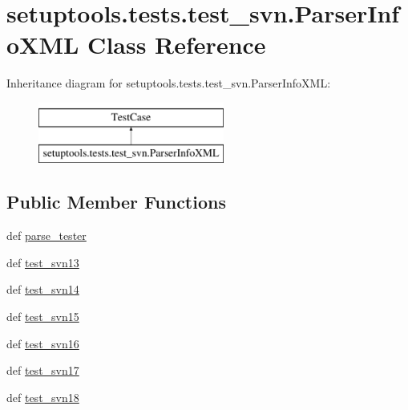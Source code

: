 \hypertarget{classsetuptools_1_1tests_1_1test__svn_1_1ParserInfoXML}{}\section{setuptools.\+tests.\+test\+\_\+svn.\+Parser\+Info\+X\+M\+L Class Reference}
\label{classsetuptools_1_1tests_1_1test__svn_1_1ParserInfoXML}
Inheritance diagram for setuptools.\+tests.\+test\+\_\+svn.\+Parser\+Info\+X\+M\+L\+:\begin{figure}[H]
\begin{center}
\leavevmode
\includegraphics[height=2.000000cm]{classsetuptools_1_1tests_1_1test__svn_1_1ParserInfoXML}
\end{center}
\end{figure}
\subsection*{Public Member Functions}
\begin{DoxyCompactItemize}
\item 
def \hyperlink{classsetuptools_1_1tests_1_1test__svn_1_1ParserInfoXML_afccd5fef4261d0432ed30f0d3e3419e4}{parse\+\_\+tester}
\item 
def \hyperlink{classsetuptools_1_1tests_1_1test__svn_1_1ParserInfoXML_aa97bc33b0b383e0e05e02806a6429cc3}{test\+\_\+svn13}
\item 
def \hyperlink{classsetuptools_1_1tests_1_1test__svn_1_1ParserInfoXML_a5765158c19d1830081243aa35244d410}{test\+\_\+svn14}
\item 
def \hyperlink{classsetuptools_1_1tests_1_1test__svn_1_1ParserInfoXML_a11449a7d9953c858ea78e19a474affeb}{test\+\_\+svn15}
\item 
def \hyperlink{classsetuptools_1_1tests_1_1test__svn_1_1ParserInfoXML_a6505eddb246f9bef2a85f9983a1b3541}{test\+\_\+svn16}
\item 
def \hyperlink{classsetuptools_1_1tests_1_1test__svn_1_1ParserInfoXML_a71b0f34e3b9b193ff37a25891341ba42}{test\+\_\+svn17}
\item 
def \hyperlink{classsetuptools_1_1tests_1_1test__svn_1_1ParserInfoXML_aece18119e9502f0cd7dcddb6e0bb100b}{test\+\_\+svn18}
\end{DoxyCompactItemize}



